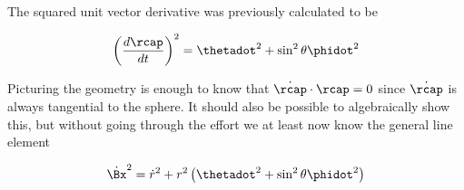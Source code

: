 The squared unit vector derivative was previously calculated to be

\begin{align}\label{eqn:sphericalPolarUnit:xoo2}
\left(\frac{d \rcap}{dt}\right)^2 = \thetadot^2 + \sin^2\theta \phidot^2 
\end{align}

Picturing the geometry is enough to know that $\dot{\rcap} \cdot \rcap = 0$ since $\dot{\rcap}$ is always tangential to the sphere.  It should also be possible to algebraically show this, but without going through the effort we at least now know the general line element

\begin{align}\label{eqn:sphericalPolarUnit:xoo3}
\dot{\Bx}^2 = {\dot{r}}^2 + r^2 \left( \thetadot^2 + \sin^2\theta \phidot^2 \right)
\end{align}

\EndArticle
